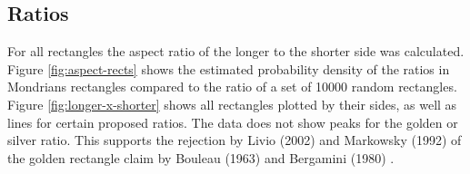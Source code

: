 \documentclass[serif,article,noparskip]{agse-thesis}
\begin{document}
\subsection{Ratios} \label{ratios}

For all rectangles the aspect ratio of the longer to the shorter side was
calculated. Figure \ref{fig:aspect-rects} shows the estimated probability
density of the ratios in Mondrians rectangles compared to the ratio of a set of
10000 random rectangles. Figure \ref{fig:longer-x-shorter} shows all rectangles
plotted by their sides, as well as lines for certain proposed ratios. The data
does not show peaks for the golden or silver ratio. This supports the rejection
by Livio (2002) \cite{Livio2002} and Markowsky (1992) \cite{Markowsky1992} of
the golden rectangle claim by Bouleau (1963) \cite{bouleau1963} and Bergamini
(1980) \cite{bergamini1980}.
\end{document}
